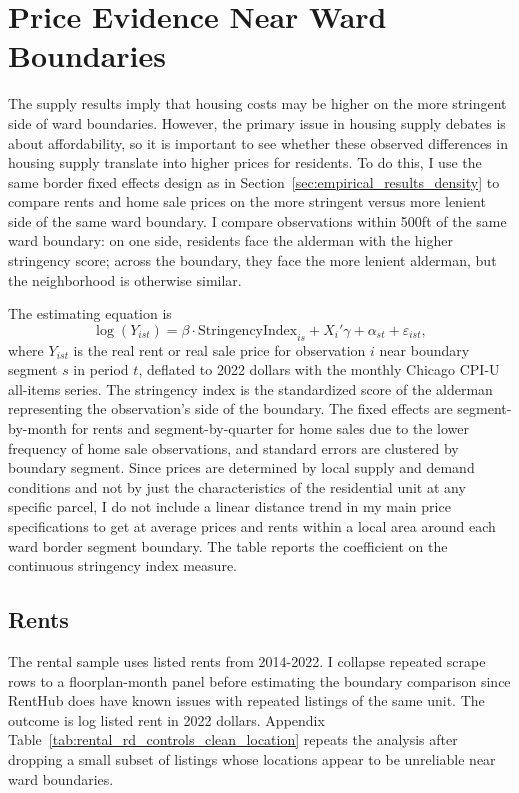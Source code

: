 \section{Price Evidence Near Ward Boundaries}
\label{sec:empirical_results_prices}

The supply results imply that housing costs may be higher on the more stringent side of ward boundaries.
However, the primary issue in housing supply debates is about affordability, so it is important to see whether these observed differences in housing supply translate into higher prices for residents.
To do this, I use the same border fixed effects design as in Section~\ref{sec:empirical_results_density} to compare rents and home sale prices on the more stringent versus more lenient side of the same ward boundary.
I compare observations within 500ft of the same ward boundary: on one side, residents face the alderman with the higher stringency score; across the boundary, they face the more lenient alderman, 
but the neighborhood is otherwise similar.

The estimating equation is
%
\begin{equation}
\label{eq:price_rd}
    \log(Y_{ist}) = \beta \cdot \text{StringencyIndex}_{is} + X_i'\gamma + \alpha_{s t} + \varepsilon_{ist},
\end{equation}
%
where $Y_{ist}$ is the real rent or real sale price for observation $i$ near boundary segment $s$ in period $t$, deflated to 2022 dollars with the monthly Chicago CPI-U all-items series.
The stringency index is the standardized score of the alderman representing the observation's side of the boundary.
The fixed effects are segment-by-month for rents and segment-by-quarter for home sales due to the lower frequency of home sale observations, and standard errors are clustered by boundary segment.
Since prices are determined by local supply and demand conditions and not by just the characteristics of the residential unit at any specific parcel, I do not include a linear distance trend in my main price specifications to get at average prices and rents within a local area around each ward border segment boundary.
The table reports the coefficient on the continuous stringency index measure.

\subsection{Rents}

The rental sample uses listed rents from 2014-2022.
I collapse repeated scrape rows to a floorplan-month panel before estimating the boundary comparison since RentHub does have known issues with repeated listings of the same unit.
The outcome is log listed rent in 2022 dollars.
Appendix Table~\ref{tab:rental_rd_controls_clean_location} repeats the analysis after dropping a small subset of listings whose locations appear to be unreliable near ward boundaries.


